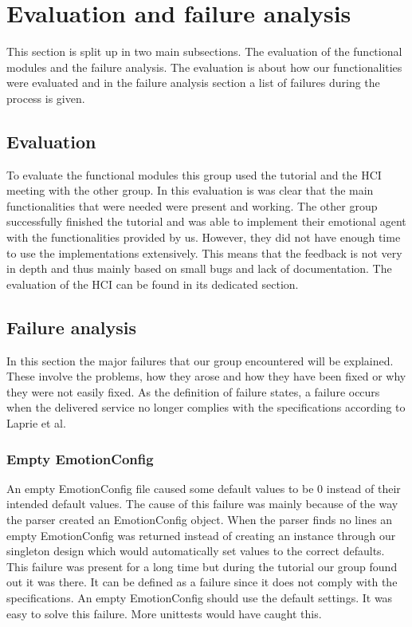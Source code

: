 \documentclass[11pt]{article}
\begin{document}
\section{Evaluation and failure analysis}
This section is split up in two main subsections. The evaluation of the functional modules and the failure analysis. The evaluation is about how our functionalities were evaluated and in the failure analysis section a list of failures during the process is given.

\subsection{Evaluation}
To evaluate the functional modules this group used the tutorial and the \gls{HCI} meeting with the other group. In this evaluation is was clear that the main functionalities that were needed were present and working. The other group successfully finished the tutorial and was able to implement their emotional agent with the functionalities provided by us. However, they did not have enough time to use the implementations extensively. This means that the feedback is not very in depth and thus mainly based on small bugs and lack of documentation. The evaluation of the HCI can be found in its dedicated section.

\subsection{Failure analysis}
In this section the major failures that our group encountered will be explained. These involve the problems, how they arose and how they have been fixed or why they were not easily fixed. As the definition of failure states, a failure occurs when the delivered service no longer complies with the specifications according to Laprie et al.\cite{failure}

\subsubsection*{Empty EmotionConfig}
An empty EmotionConfig\cite{emotionconfig} file caused some default values to be 0 instead of their intended default values. The cause of this failure was mainly because of the way the parser created an EmotionConfig object. When the parser finds no lines an empty EmotionConfig was returned instead of creating an instance through our singleton design which would automatically set values to the correct defaults. This failure was present for a long time but during the tutorial our group found out it was there. It can be defined as a failure since it does not comply with the specifications. An empty EmotionConfig should use the default settings. It was easy to solve this failure. More unittests would have caught this.
\end{document}
